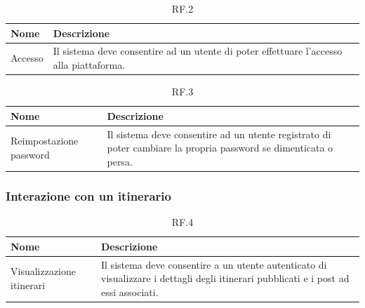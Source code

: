 \documentclass{natourDoc}
\begin{document}
\begin{table}[H]
	\centering
	\begin{tabular}{ |p{5cm}|p{10.3cm}| }
		\hline
		\rowcolor{PineGreen!70}
		\textbf{Nome} & \textbf{Descrizione}                                                                    \\
		\hline
		Accesso       & Il sistema deve consentire ad un utente di poter effettuare l'accesso alla piattaforma. \\
		\hline
	\end{tabular}
	\caption{RF.2}
	\label{table:2}
\end{table}

\begin{table}[H]
	\centering
	\begin{tabular}{ |p{5cm}|p{10.3cm}| }
		\hline
		\rowcolor{PineGreen!70}
		\textbf{Nome}           & \textbf{Descrizione}                                                                                             \\
		\hline
		Reimpostazione password & Il sistema deve consentire ad un utente registrato di poter cambiare la propria password se dimenticata o persa. \\
		\hline
	\end{tabular}
	\caption{RF.3}
	\label{table:3}
\end{table}


\subsubsection{Interazione con un itinerario}
\begin{table}[H]
	\centering
	\begin{tabular}{ |p{5cm}|p{10.3cm}| }
		\hline
		\rowcolor{PineGreen!70}
		\textbf{Nome}             & \textbf{Descrizione}                                                 \\
		\hline
		Visualizzazione itinerari & Il sistema deve consentire a un utente autenticato di visualizzare i
		dettagli degli itinerari pubblicati e i post ad essi associati.                                  \\
		\hline
	\end{tabular}
	\caption{RF.4}
	\label{table:4}
\end{table}
\end{document}

